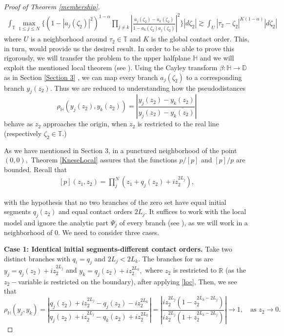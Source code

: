 \documentclass[11pt]{amsart}
\numberwithin{equation}{section}
\begin{document}
\begin{proof}[Proof of Theorem \ref{membership}]
\begin{align}
\int_{\mathbb{T}}\max_{1\leq j\leq N}\Biggl\{(1-|a_j(\zeta_2)|^2)^{1-\alpha}\prod_{j\neq k}\left|\frac{a_{j}(\zeta_2)-a_{k}(\zeta_2)}{1-\overline{a_{k}(\zeta_2)}a_{j}(\zeta_2)}\right|^2\Biggr\}|d\zeta_2|\gtrsim \int_{U}|\tau_2-\zeta_2|^{K(1-\alpha)}|d\zeta_2|
\end{align}
where $U$ is a neighborhood around $\tau_2\in\mathbb{T}$ and $K$ is the global contact order. This, in turn, would provide us the desired result. In order to be able to prove this rigorously, we will transfer the problem to the upper halfplane $\mathbb{H}$ and we will exploit the mentioned local theorem (see \cite[Theorem 1.2]{Polonici}). Using the Cayley transform $\beta:\mathbb{H}\to \mathbb{D}$ as in Section \ref{Section 3} , we can map every branch $a_j(\zeta_2)$ to a corresponding branch $y_j(z_2).$ Thus we are reduced to understanding how the pseudodistances
$$\rho_{\mathbb{H}}(y_j(z_2),y_k(z_2))=\left|\frac{y_j(z_2)-y_k(z_2)}{y_j(z_2)-\overline{y_k(z_2)}}\right|$$
behave as $z_2$ approaches the origin, when $z_2$ is restricted to the real line (respectively $\zeta_2\in\mathbb{T}.$)

As we have mentioned in Section 3, in a punctured neighborhood of the point $(0,0),$ Theorem \ref{KneseLocal} assures that the functions $p/[p]$ and $[p]/p$ are bounded. Recall that 
\begin{align}\label{loc}
[p](z_1,z_2)=\prod_{j}^{N}(z_1+q_j(z_2)+iz_2^{2L_j}),
\end{align}

with the hypothesis that no two branches of the zero set have equal initial segments $q_j(z_2)$ and equal contact orders $2L_j.$  It suffices to work with the local model and ignore the analytic part $\Psi_j$ of every branch (see \cite{TAMSKNESE}), as we will work in a neighborhood of $0$. We need to consider three cases.

\textbf{Case 1: Identical initial segments-different contact orders.}
Take two distinct branches with $q_i=q_j$ and $2L_j<2L_k.$ The branches for us are
$y_j=q_j(z_2)+iz_2^{2L_j}$
and $y_k=q_j(z_2)+iz_2^{2L_k},$ where $z_2$ is restricted to $\mathbb{R}$ (as the $z_2-$variable is restricted on the boundary), after applying \ref{loc},
Then, we see that 
$$
\rho_{\mathbb{H}}(y_j,y_k)=\left|\frac{q_{j}(z_2)+iz_2^{2L_j}-q_{j}(z_2)-iz_2^{2L_k}}{q_{j}(z_2)+iz_2^{2L_j}-q_{k}(z_2)+iz_2^{2L_k}}\right|=\left|\frac{iz_2^{2L_j}(1-z_2^{2L_k-2L_j})}{iz_2^{2L_j}(1+z_2^{2L_k-2L_j})}\right|\to 1, \quad \textrm{as}\, \,z_2 \to 0.
$$


\end{proof}
\end{document}
